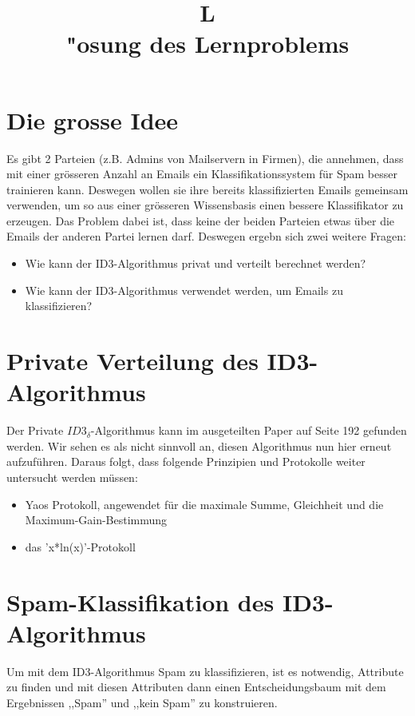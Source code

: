 \documentclass[12pt]{article}
\title{L\\"osung des Lernproblems}
\begin{document}
\section{Die grosse Idee}
Es gibt 2 Parteien (z.B. Admins von Mailservern in Firmen), die annehmen, dass
mit einer gr\"osseren Anzahl an Emails ein Klassifikationssystem f\"ur Spam besser
trainieren kann. Deswegen wollen sie ihre bereits klassifizierten Emails
gemeinsam verwenden, um so aus einer gr\"osseren Wissensbasis einen bessere
Klassifikator zu erzeugen.
Das Problem dabei ist, dass keine der beiden Parteien etwas \"uber die Emails der
anderen Partei lernen darf. Deswegen ergebn sich zwei weitere Fragen: 
\begin{itemize}
 \item Wie kann der ID3-Algorithmus privat und verteilt berechnet werden?
 \item Wie kann der ID3-Algorithmus verwendet werden, um Emails zu klassifizieren?
\end{itemize}
\section{Private Verteilung des ID3-Algorithmus}
Der Private $ID3_{\delta}$-Algorithmus kann im ausgeteilten Paper auf Seite 192
gefunden werden. Wir sehen es als nicht sinnvoll an, diesen Algorithmus nun hier
erneut aufzuf\"uhren. Daraus folgt, dass folgende Prinzipien und Protokolle
weiter untersucht werden m\"ussen:

\begin{itemize}
 \item Yaos Protokoll, angewendet f\"ur die maximale Summe, Gleichheit und 
   die Maximum-Gain-Bestimmung
 \item das 'x*ln(x)'-Protokoll
\end{itemize}

\section{Spam-Klassifikation des ID3-Algorithmus}
Um mit dem ID3-Algorithmus Spam zu klassifizieren, ist es notwendig, Attribute
zu finden und mit diesen Attributen dann einen Entscheidungsbaum mit dem
Ergebnissen ,,Spam'' und ,,kein Spam'' zu konstruieren.
\end{document}
